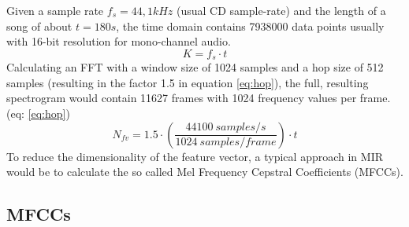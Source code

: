 Given a sample rate $f_s = 44,1kHz$ (usual CD sample-rate) and the length of a song of about $t = 180s$, the time domain contains 7938000 data points usually with 16-bit resolution for mono-channel audio. 
\begin{equation} \label{eq:points}
K = f_s \cdot t
\end{equation}
Calculating an FFT with a window size of 1024 samples and a hop size of 512 samples (resulting in the factor 1.5 in equation \ref{eq:hop})\cite[p. 41]{knees1}, the full, resulting spectrogram would contain 11627 frames with 1024 frequency values per frame. (eq: \ref{eq:hop}) 
\begin{equation} \label{eq:hop}
N_{fv} = 1.5 \cdot (\frac{44100 \ samples/s}{1024 \ samples/frame}) \cdot t
\end{equation}
To reduce the dimensionality of the feature vector, a typical approach in MIR would be to calculate the so called Mel Frequency Cepstral Coefficients (MFCCs).

\subsection{MFCCs}\label{mfccsim}

